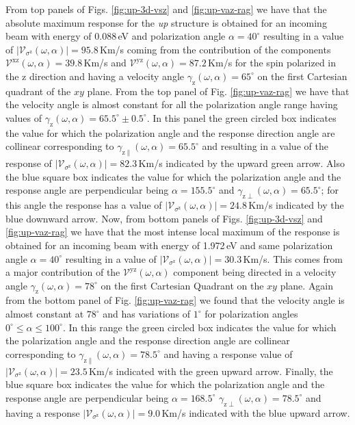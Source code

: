 \documentclass[prb,11pt,tightenlines,twocolumn,aps]{revtex4-1}
\begin{document}
From top panels of Figs. \ref{fig:up-3d-vsz} and \ref{fig:up-vaz-rag} we have
that the absolute maximum response for the \emph{up} structure is obtained for
an incoming beam with energy of 0.088\,eV and polarization angle
$\alpha=40^{\circ}$ resulting in a value of
$|\mathcal{V}_{\sigma^{\mathrm{z}}}(\omega,\alpha)|=95.8$\,Km/s coming from the
contribution of the components
$\mathcal{V}^{\mathrm{xz}}(\omega,\alpha)=39.8$\,Km/s and
$\mathcal{V}^{\mathrm{yz}}(\omega,\alpha)=87.2$\,Km/s for the spin polarized in
the $\mathrm{z}$ direction and having a velocity angle
$\gamma_{\mathrm{z}}(\omega,\alpha)=65^{\circ}$ on the first Cartesian quadrant
of the $xy$ plane.
% 
{\color{red} From the top panel of Fig. \ref{fig:up-vaz-rag} we have that the
velocity angle is almost constant for all the polarization angle range having
values of $\gamma_{\mathrm{z}}(\omega,\alpha) = 65.5^{\circ} \pm 0.5^{\circ}$.
In this panel the green circled box indicates the value for which the
polarization angle and the response direction angle are collinear corresponding
to $\gamma_{\mathrm{z}\parallel}(\omega,\alpha) = 65.5^{\circ}$ and resulting
in a value of the response of
$|\mathcal{V}_{\sigma^{\mathrm{z}}}(\omega,\alpha)| = 82.3$\,Km/s indicated by
the upward green arrow.
% 
Also the blue square box indicates the value for which the polarization angle
and the response angle are perpendicular being $\alpha=155.5^{\circ}$ and
$\gamma_{\mathrm{z}\perp}(\omega,\alpha)=65.5^{\circ}$; for this angle the
response has a value of $|\mathcal{V}_{\sigma^{\mathrm{z}}}(\omega,\alpha)| =
24.8$\,Km/s indicated by the blue downward arrow.}
% 
Now, from bottom panels of Figs. \ref{fig:up-3d-vsz} and \ref{fig:up-vaz-rag}
we have that the most intense local maximum of the response is obtained for an
incoming beam with energy of 1.972\,eV and same polarization angle
$\alpha=40^{\circ}$ resulting in a value of
$|\mathcal{V}_{\sigma^{\mathrm{z}}}(\omega,\alpha)|=30.3$\,Km/s. This comes
from a major contribution of the $\mathcal{V}^{\mathrm{yz}}(\omega,\alpha)$
component being directed in a velocity angle
$\gamma_{\mathrm{z}}(\omega,\alpha) = 78^{\circ}$ on the first Cartesian
Quadrant on the $xy$ plane.
% 
{\color{red} Again from the bottom panel of Fig. \ref{fig:up-vaz-rag} we found
that the velocity angle is almost constant at $78^{\circ}$ and has variations
of $1^{\circ}$ for polarization angles $0^{\circ} \leq \alpha \leq
100^{\circ}$. In this range the green circled box indicates the value for which
the polarization angle and the response direction angle are collinear
corresponding to $\gamma_{\mathrm{z}\parallel}(\omega,\alpha) = 78.5^{\circ}$
and having a response value of
$|\mathcal{V}_{\sigma^{\mathrm{z}}}(\omega,\alpha)| = 23.5$\,Km/s indicated
with the green upward arrow.
% 
Finally, the blue square box indicates the value for which the polarization
angle and the response angle are perpendicular being $\alpha=168.5^{\circ}$
$\gamma_{\mathrm{z}\perp}(\omega,\alpha) = 78.5^{\circ}$ and having a response
$|\mathcal{V}_{\sigma^{\mathrm{z}}}(\omega,\alpha)|=9.0$\,Km/s indicated with
the blue upward arrow.}
\end{document}
